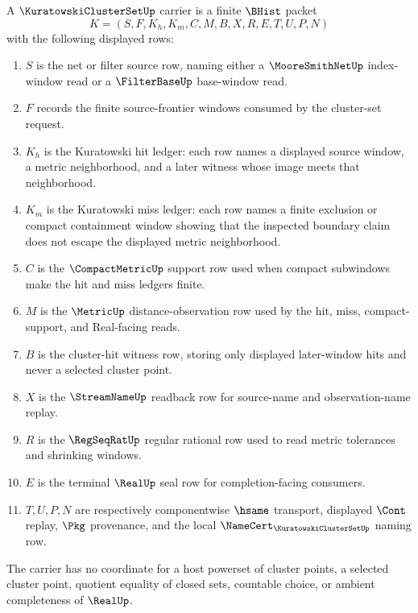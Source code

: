 \begin{definition}
\label{def:kuratowski-cluster-set-carrier}
A $\KuratowskiClusterSetUp$ carrier is a finite $\BHist$ packet
$$
K=(S,F,K_h,K_m,C,M,B,X,R,E,T,U,P,N)
$$
with the following displayed rows:
\begin{enumerate}
\item $S$ is the net or filter source row, naming either a $\MooreSmithNetUp$ index-window read or a $\FilterBaseUp$ base-window read.
\item $F$ records the finite source-frontier windows consumed by the cluster-set request.
\item $K_h$ is the Kuratowski hit ledger: each row names a displayed source window, a metric neighborhood, and a later witness whose image meets that neighborhood.
\item $K_m$ is the Kuratowski miss ledger: each row names a finite exclusion or compact containment window showing that the inspected boundary claim does not escape the displayed metric neighborhood.
\item $C$ is the $\CompactMetricUp$ support row used when compact subwindows make the hit and miss ledgers finite.
\item $M$ is the $\MetricUp$ distance-observation row used by the hit, miss, compact-support, and Real-facing reads.
\item $B$ is the cluster-hit witness row, storing only displayed later-window hits and never a selected cluster point.
\item $X$ is the $\StreamNameUp$ readback row for source-name and observation-name replay.
\item $R$ is the $\RegSeqRatUp$ regular rational row used to read metric tolerances and shrinking windows.
\item $E$ is the terminal $\RealUp$ seal row for completion-facing consumers.
\item $T,U,P,N$ are respectively componentwise $\hsame$ transport, displayed $\Cont$ replay, $\Pkg$ provenance, and the local $\NameCert_{\KuratowskiClusterSetUp}$ naming row.
\end{enumerate}
The carrier has no coordinate for a host powerset of cluster points, a selected cluster point, quotient equality of closed sets, countable choice, or ambient completeness of $\RealUp$.
\end{definition}

